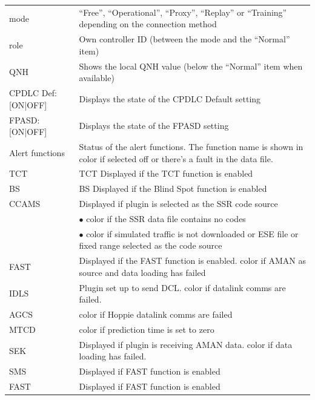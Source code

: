 \documentclass[a4paper,oneside,11pt]{memoir}
\begin{document}
\begin{longtable}{p{2.5cm} p{10cm}}
    mode                & “Free”, “Operational”, “Proxy”, “Replay” or “Training” depending on the connection method \\
    role                & Own controller ID (between the mode and the “Normal” item)\\
    QNH                 & Shows the local QNH value (below the “Normal” item when available)\\
    CPDLC Def: [ON|OFF] & Displays the state of the CPDLC Default setting\\
    FPASD: [ON|OFF]     & Displays the state of the FPASD setting \\
    Alert functions     & Status of the alert functions. The function name is shown in {Warning} color if selected off or there’s a fault in the data file.\\
    TCT                 & TCT Displayed if the TCT function is enabled\\
    BS                  & BS Displayed if the Blind Spot function is enabled\\
    CCAMS               & Displayed if plugin is selected as the SSR code source\\
                        & $\bullet$ {Urgency} color if the SSR data file contains no codes\\
                        & $\bullet$ {Warning} color if simulated traffic is not downloaded or ESE file or fixed range selected as the code source\\
    FAST                & Displayed if the FAST function is enabled. {Warning} color if AMAN as source and data loading has failed \\
    IDLS                & Plugin set up to send DCL. {Warning} color if datalink comms are failed.\\
    AGCS                & {Warning} color if Hoppie datalink comms are failed\\
    MTCD                & {Warning} color if prediction time is set to zero    \\
    SEK                 & Displayed if plugin is receiving AMAN data. {Warning} color if data loading has failed.\\
    SMS                 & Displayed if FAST function is enabled \\
    FAST                & Displayed if FAST function is enabled \\
\end{longtable}
\end{document}
